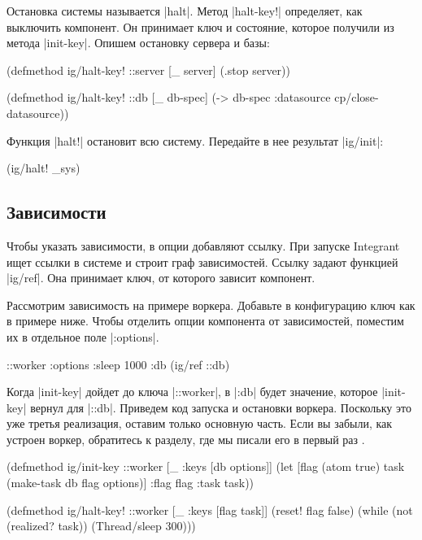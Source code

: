 Остановка системы называется \spverb|halt|. Метод \spverb|halt-key!| определяет,
как выключить компонент. Он принимает ключ и состояние, которое получили из
метода \spverb|init-key|. Опишем остановку сервера и базы:

\begin{english}
  \begin{clojure}
(defmethod ig/halt-key! ::server
  [_ server]
  (.stop server))

(defmethod ig/halt-key! ::db
  [_ db-spec]
  (-> db-spec :datasource cp/close-datasource))
  \end{clojure}
\end{english}

\noindent
Функция \spverb|halt!| остановит всю систему. Передайте в нее результат
\spverb|ig/init|:

\begin{english}
  \begin{clojure}
(ig/halt! _sys)
  \end{clojure}
\end{english}

\subsection{Зависимости}

Чтобы указать зависимости, в опции добавляют ссылку. При запуске Integrant ищет
ссылки в системе и строит граф зависимостей. Ссылку задают функцией
\spverb|ig/ref|. Она принимает ключ, от которого зависит компонент.

Рассмотрим зависимость на примере воркера. Добавьте в конфигурацию ключ как в
примере ниже. Чтобы отделить опции компонента от зависимостей, поместим их в
отдельное поле \spverb|:options|.

\begin{english}
  \begin{clojure}
{::worker {:options {:sleep 1000}
           :db (ig/ref ::db)}}
  \end{clojure}
\end{english}

Когда \spverb|init-key| дойдет до ключа \spverb|::worker|, в \spverb|:db| будет
значение, которое \spverb|init-key| вернул для \spverb|::db|. Приведем код
запуска и остановки воркера. Поскольку это уже третья реализация, оставим только
основную часть. Если вы забыли, как устроен воркер, обратитесь к разделу, где мы
писали его в первый раз .

\begin{english}
  \begin{clojure}
(defmethod ig/init-key ::worker
  [_ {:keys [db options]}]
  (let [flag (atom true)
        task (make-task db flag options)]
    {:flag flag :task task}))

(defmethod ig/halt-key! ::worker
  [_ {:keys [flag task]}]
  (reset! flag false)
  (while (not (realized? task))
    (Thread/sleep 300)))
  \end{clojure}
\end{english}

